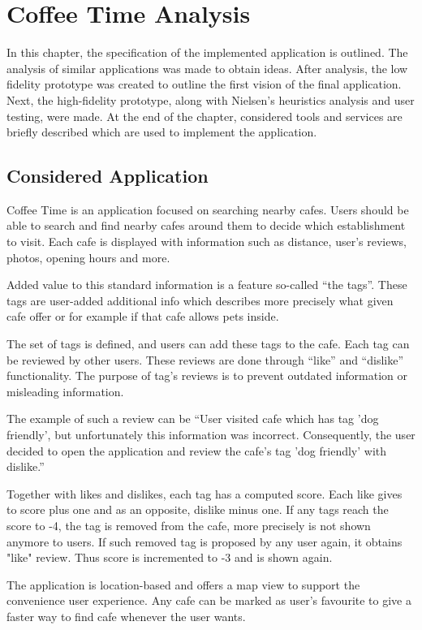 \chapter{Coffee Time Analysis}
In this chapter, the specification of the implemented application is outlined. The analysis of similar applications was made to obtain ideas.  After analysis, the low fidelity prototype was created to outline the first vision of the final application. Next, the high-fidelity prototype, along with Nielsen's heuristics analysis and user testing, were made. At the end of the chapter, considered tools and services are briefly described which are used to implement the application. 

\section{Considered Application}

Coffee Time is an application focused on searching nearby cafes. Users should be able to search and find nearby cafes around them to decide which establishment to visit. Each cafe is displayed with information such as distance, user's reviews, photos, opening hours and more. 

Added value to this standard information is a feature so-called ``the tags''. These tags are user-added additional info which describes more precisely what given cafe offer or for example if that cafe allows pets inside. 

The set of tags is defined, and users can add these tags to the cafe.  Each tag can be reviewed by other users. These reviews are done through ``like'' and ``dislike'' functionality. The purpose of tag's reviews is to prevent outdated information or misleading information.  

The example of such a review can be ``User visited cafe which has tag 'dog friendly', but unfortunately this information was incorrect. Consequently, the user decided to open the application and review the cafe's tag 'dog friendly' with dislike.''

Together with likes and dislikes, each tag has a computed score.  Each like gives to score plus one and as an opposite, dislike minus one. 
If any tags reach the score to -4, the tag is removed from the cafe, more precisely is not shown anymore to users. 
If such removed tag is proposed by any user again, it obtains "like" review. Thus score is incremented to -3 and is shown again. 

The application is location-based and offers a map view to support the convenience user experience. Any cafe can be marked as user's favourite to give a faster way to find cafe whenever the user wants. 

